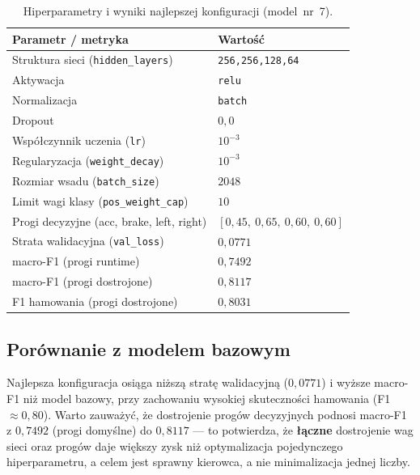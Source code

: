 \documentclass[11pt,a4paper]{article}
\begin{document}
\begin{table}[H]
  \centering
  \caption{Hiperparametry i wyniki najlepszej konfiguracji (model~nr~7).}
  \label{tab:best}
  \begin{tabular}{ll}
    \toprule
    \textbf{Parametr / metryka} & \textbf{Wartość} \\
    \midrule
    Struktura sieci (\texttt{hidden\_layers}) & \texttt{256,256,128,64} \\
    Aktywacja                                  & \texttt{relu} \\
    Normalizacja                               & \texttt{batch} \\
    Dropout                                    & $0{,}0$ \\
    Współczynnik uczenia (\texttt{lr})         & $10^{-3}$ \\
    Regularyzacja (\texttt{weight\_decay})     & $10^{-3}$ \\
    Rozmiar wsadu (\texttt{batch\_size})       & $2048$ \\
    Limit wagi klasy (\texttt{pos\_weight\_cap}) & $10$ \\
    Progi decyzyjne (acc, brake, left, right)  & $[0{,}45,\ 0{,}65,\ 0{,}60,\ 0{,}60]$ \\
    \midrule
    Strata walidacyjna (\texttt{val\_loss})    & $0{,}0771$ \\
    macro-F1 (progi runtime)                   & $0{,}7492$ \\
    macro-F1 (progi dostrojone)                & $0{,}8117$ \\
    F1 hamowania (progi dostrojone)            & $0{,}8031$ \\
    \bottomrule
  \end{tabular}
\end{table}

\subsection{Porównanie z modelem bazowym}

Najlepsza konfiguracja osiąga niższą stratę walidacyjną ($0{,}0771$) i wyższe
macro-F1 niż model bazowy, przy zachowaniu wysokiej skuteczności hamowania
(F1 $\approx 0{,}80$). Warto zauważyć, że dostrojenie progów decyzyjnych podnosi
macro-F1 z $0{,}7492$ (progi domyślne) do $0{,}8117$ --- to potwierdza, że
\textbf{łączne} dostrojenie wag sieci oraz progów daje większy zysk niż optymalizacja
pojedynczego hiperparametru, a celem jest sprawny kierowca, a nie minimalizacja
jednej liczby.
\end{document}
